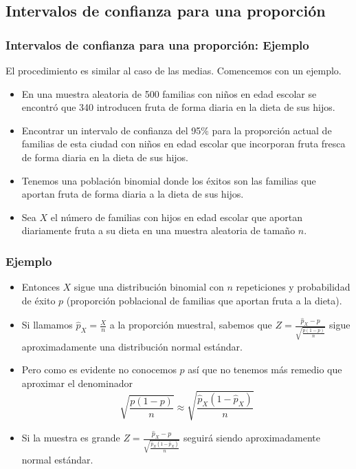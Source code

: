 \subsection{Intervalos de confianza para una proporción}
\begin{frame}

\frametitle{Intervalos de confianza para una proporción: Ejemplo}
El procedimiento  es similar al caso de las medias. Comencemos con un ejemplo.

\begin{itemize}
\item En una muestra aleatoria  de 500 familias con niños en edad escolar se encontró que 340 introducen fruta de forma diaria en la dieta de sus hijos. 
\item Encontrar un intervalo de confianza del 95\% para la proporción  actual de familias de esta ciudad con niños en edad escolar que incorporan fruta fresca de forma diaria en la dieta de sus hijos.
\item Tenemos una población binomial donde los éxitos son las familias que aportan fruta de forma diaria a la dieta de sus hijos. \item Sea $X$ el número de familias con hijos en edad escolar que aportan diariamente fruta a su dieta en una muestra aleatoria de
tamaño $n$.

\end{itemize}
\end{frame}
\begin{frame}
\frametitle{Ejemplo}

\begin{itemize}
\item  Entonces $X$ sigue una distribución binomial con $n$ repeticiones y
probabilidad de éxito $p$ (proporción poblacional de familias  que aportan fruta a la dieta).
\item Si llamamos $\hat{p}_{X}=\frac{X}{n}$ a la proporción muestral, sabemos que
$Z=\frac{\hat{p}_{X}-p}{\sqrt{\frac{p(1-p)}{n}}}$ sigue aproximadamente una distribución
normal estándar.
\item Pero como es evidente no conocemos $p$ así que no tenemos más remedio que  aproximar el
denominador
$$\sqrt{\frac{p(1-p)}{n}}\approx \sqrt{\frac{\hat{p}_{X}(1-\hat{p}_{X})}{n}}$$
\item 
Si la muestra es grande $Z=\frac{\hat{p}_{X}-p}
{\sqrt{\frac{\hat{p}_{X}(1-\hat{p}_{X})}{n}}}$ seguirá siendo aproximadamente normal
estándar.
\end{itemize}
\end{frame}


